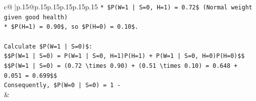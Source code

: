 \documentclass{article}
\begin{document}
{\begin{supertabular}{c@{$\;$}|p{.15\linewidth}@{}p{.15\linewidth}p{.15\linewidth}p{.15\linewidth}p{.15\linewidth}p{.15\linewidth}}
{{{\texttt{*   \$P(W=1 | S=0, H=1) = 0.72\$ (Normal weight given good health)} \\
\texttt{*   \$P(H=1) = 0.90\$, so \$P(H=0) = 0.10\$.} \\
\\ 
\texttt{Calculate \$P(W=1 | S=0)\$:} \\
\texttt{\$\$P(W=1 | S=0) = P(W=1 | S=0, H=1)P(H=1) + P(W=1 | S=0, H=0)P(H=0)\$\$} \\
\texttt{\$\$P(W=1 | S=0) = (0.72 \textbackslash{}times 0.90) + (0.51 \textbackslash{}times 0.10) = 0.648 + 0.051 = 0.699\$\$} \\
\texttt{Consequently, \$P(W=0 | S=0) = 1 {-}} \\
            }
        }
    }
    & \\ \\


\end{supertabular}}
\end{document}
